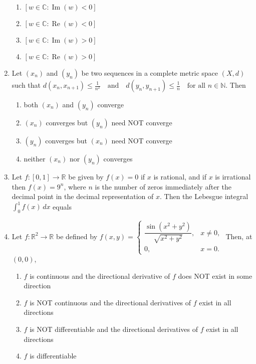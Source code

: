 \documentclass{article}
\newcommand{\brak}[1]{\left( #1 \right)}
\newcommand{\sbrak}[1]{\left[ #1 \right]}
\newcommand{\lt}{<}
\newcommand{\gt}{>}
\begin{document}
\begin{enumerate}
\begin{enumerate}
    \item $\sbrak{w \in \mathbb{C} : \operatorname{Im} \brak{w} \lt 0}$
    \item $\sbrak{w \in \mathbb{C} : \operatorname{Re} \brak{w} \lt 0}$
    \item $\sbrak{w \in \mathbb{C} : \operatorname{Im} \brak{w} \gt 0}$
    \item $\sbrak{w \in \mathbb{C} : \operatorname{Re} \brak{w} \gt 0}$
\end{enumerate}

\item Let $\brak{x_n}$ and $\brak{y_n}$ be two sequences in a complete metric space $\brak{X, d}$ such that 
$d \brak{x_n, x_{n+1}} \leq \frac{1}{n^2} \quad \text{and} \quad d \brak{y_n, y_{n+1}} \leq \frac{1}{n} \quad \text{for all } n \in \mathbb{N}.$
Then

\begin{enumerate}
    \item both $\brak{x_n}$ and $\brak{y_n}$ converge
    \item $\brak{x_n}$ converges but $\brak{y_n}$ need NOT converge
    \item $\brak{y_n}$ converges but $\brak{x_n}$ need NOT converge
    \item neither $\brak{x_n}$ nor $\brak{y_n}$ converges
\end{enumerate}

\item Let $f: \sbrak{0, 1} \to \mathbb{R}$ be given by $f \brak{x} = 0$ if $x$ is rational, and if $x$ is irrational then $f \brak{x} = 9^n$, where $n$ is the number of zeros immediately after the decimal point in the decimal representation of $x$. Then the Lebesgue integral
$\int_0^1 f \brak{x} \, dx$
equals 

\item Let $f: \mathbb{R}^2 \to \mathbb{R}$ be defined by 
$f \brak{x, y} = \begin{cases}
\dfrac{\sin \brak{x^2 + y^2}}{\sqrt{x^2 + y^2}}, & x \neq 0, \\
0, & x = 0.
\end{cases}$
Then, at $\brak{0, 0}$,

\begin{enumerate}
    \item $f$ is continuous and the directional derivative of $f$ does NOT exist in some direction
    \item $f$ is NOT continuous and the directional derivatives of $f$ exist in all directions
    \item $f$ is NOT differentiable and the directional derivatives of $f$ exist in all directions
    \item $f$ is differentiable
\end{enumerate}


\end{enumerate}
\end{document}

